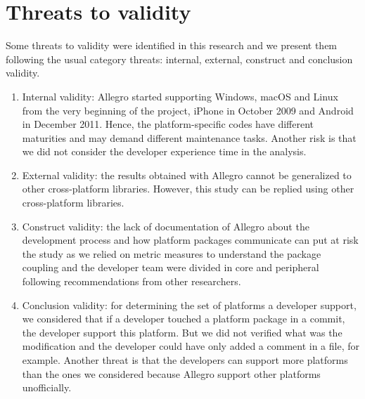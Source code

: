 \documentclass[10pt, conference]{IEEEtran}
\begin{document}

\section{Threats to validity}


Some threats to validity were identified in this research and we present them  following the usual category threats: internal, external, construct and conclusion validity.

\begin{enumerate}

\item Internal validity: Allegro started supporting Windows, macOS and Linux from the very beginning of the project, iPhone in October 2009 and Android in December 2011. Hence, the platform-specific codes have different maturities and may demand different maintenance tasks. Another risk is that we did not consider the developer experience time in the analysis.  

\item External validity: the results obtained with Allegro cannot be generalized to other cross-platform libraries. However, this study can be replied using other cross-platform libraries.

\item Construct validity: the lack of documentation of Allegro about the development process and how platform packages communicate can put at risk the study as we relied on metric measures to understand the package coupling and the developer team were divided in core and peripheral following recommendations from other researchers. 

\item Conclusion validity: for determining the set of platforms a developer support, we considered that if a developer touched a platform package in a commit, the developer support this platform. But we did not verified  what was the modification and the developer could have only added a comment in a file, for example. Another threat is that the developers can support more platforms than the ones we considered because Allegro support other platforms unofficially. 

\end{enumerate}
\end{document}
